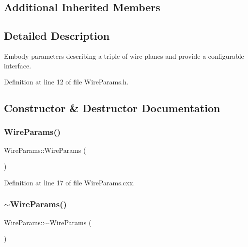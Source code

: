 \subsection*{Additional Inherited Members}


\subsection{Detailed Description}
Embody parameters describing a triple of wire planes and provide a configurable interface. 

Definition at line 12 of file Wire\+Params.\+h.



\subsection{Constructor \& Destructor Documentation}
\mbox{\label{class_wire_cell_1_1_wire_params_a444210719faa33678a688b00b89ac0b4}} 
\subsubsection{\texorpdfstring{Wire\+Params()}{WireParams()}}
{\footnotesize\ttfamily Wire\+Params\+::\+Wire\+Params (\begin{DoxyParamCaption}{ }\end{DoxyParamCaption})}



Definition at line 17 of file Wire\+Params.\+cxx.

\mbox{\label{class_wire_cell_1_1_wire_params_aa66d971049ed2ece8e46eaeefadbc1bb}} 
\subsubsection{\texorpdfstring{$\sim$\+Wire\+Params()}{~WireParams()}}
{\footnotesize\ttfamily Wire\+Params\+::$\sim$\+Wire\+Params (\begin{DoxyParamCaption}{ }\end{DoxyParamCaption})\hspace{0.3cm}{\ttfamily [virtual]}}



